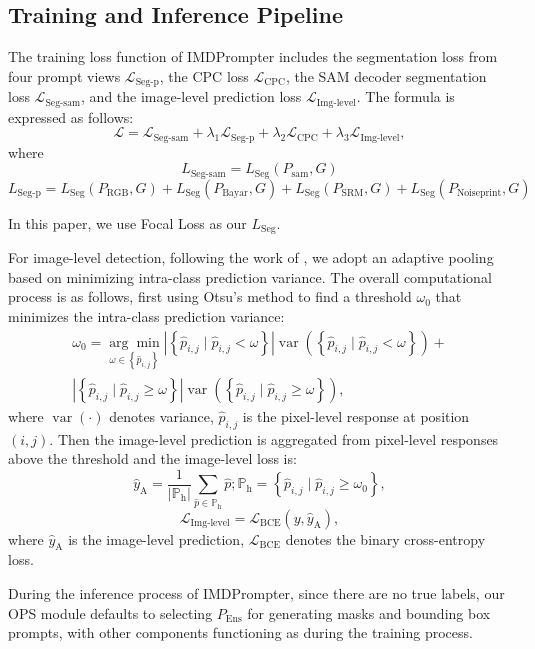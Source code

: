 \subsection{Training and Inference Pipeline}
The training loss function of IMDPrompter includes the segmentation loss from four prompt views $\mathcal{L}_{\text{Seg-p}}$, the CPC loss $\mathcal{L}_{\mathrm{CPC}}$, the SAM decoder segmentation loss $\mathcal{L}_{\text{Seg-sam}}$, and the image-level prediction loss $\mathcal{L}_{\text{Img-level}}$. The formula is expressed as follows:
\begin{equation}
\mathcal{L} = \mathcal{L}_{\text{Seg-sam}} + \lambda_1 \mathcal{L}_{\text{Seg-p}} + \lambda_2 \mathcal{L}_{\mathrm{CPC}} + \lambda_3 \mathcal{L}_{\text{Img-level}},
\end{equation}
where
\begin{equation}
L_{\text{Seg-sam}} = L_{\text{Seg}}(P_{\text{sam}}, G)
\end{equation}
\begin{equation}
L_{\text{Seg-p}} = L_{\text{Seg}}(P_{\text{RGB}}, G) + L_{\text{Seg}}(P_{\text{Bayar}}, G) + L_{\text{Seg}}(P_{\text{SRM}}, G)+ L_{\text{Seg}}(P_{\text{Noiseprint}}, G)
\end{equation}

In this paper, we use Focal Loss as our $L_{\mathrm{Seg}}$.

For image-level detection, following the work of \cite{zhai2023towards}, we adopt an adaptive pooling based on minimizing intra-class prediction variance. The overall computational process is as follows, first using Otsu's method \cite{otsu1975threshold} to find a threshold $\omega_0$ that minimizes the intra-class prediction variance:
\begin{equation}
\begin{array}{r}
\omega_0=\underset{\omega \in\left\{\hat{p}_{i, j}\right\}}{\arg \min }\left|\left\{\hat{p}_{i, j} \mid \hat{p}_{i, j}<\omega\right\}\right| \operatorname{var}\left(\left\{\hat{p}_{i, j} \mid \hat{p}_{i, j}<\omega\right\}\right)+ \\
\left|\left\{\hat{p}_{i, j} \mid \hat{p}_{i, j} \geq \omega\right\}\right| \operatorname{var}\left(\left\{\hat{p}_{i, j} \mid \hat{p}_{i, j} \geq \omega\right\}\right),
\end{array}
\end{equation}
where $\operatorname{var}(\cdot)$ denotes variance, $\hat{p}_{i, j}$ is the pixel-level response at position $(i, j)$.
Then the image-level prediction is aggregated from pixel-level responses above the threshold and the image-level loss is:
\begin{equation}
\hat{y}_{\mathrm{A}} = \frac{1}{\left| \mathbb{P}_{\mathrm{h}} \right|} \sum_{\hat{p} \in \mathbb{P}_{\mathrm{h}}} \hat{p}; \mathbb{P}_{\mathrm{h}} = \left\{\hat{p}_{i, j} \mid \hat{p}_{i, j} \geq \omega_0\right\},
\end{equation}
\begin{equation}
\mathcal{L}_{\text{Img-level}} = \mathcal{L}_{\mathrm{BCE}}(y, \hat{y}_{\mathrm{A}}),
\end{equation}
where $\hat{y}_{\mathrm{A}}$ is the image-level prediction, $\mathcal{L}_{\mathrm{BCE}}$ denotes the binary cross-entropy loss.

During the inference process of IMDPrompter, since there are no true labels, our OPS module defaults to selecting $P_{\text{Ens}}$ for generating  masks and bounding box prompts, with other components functioning as during the training process.


